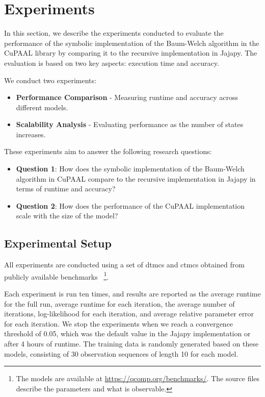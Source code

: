\section{Experiments}\label{sec:experiments}
In this section, we describe the experiments conducted to evaluate the performance of the symbolic implementation of the Baum-Welch algorithm in the CuPAAL library by comparing it to the recursive implementation in Jajapy. The evaluation is based on two key aspects: execution time and accuracy.

We conduct two experiments:
\begin{itemize}
    \item \textbf{Performance Comparison} - Measuring runtime and accuracy across different models.
    \item \textbf{Scalability Analysis} - Evaluating performance as the number of states increases.
\end{itemize}

These experiments aim to answer the following research questions:
\begin{itemize}
    \item \textbf{Question 1}: How does the symbolic implementation of the Baum-Welch algorithm in CuPAAL compare to the recursive implementation in Jajapy in terms of runtime and accuracy?
    \item \textbf{Question 2}: How does the performance of the CuPAAL implementation scale with the size of the model?
\end{itemize}

\subsection{Experimental Setup}
All experiments are conducted using a set of \glspl{dtmc} and \glspl{ctmc} obtained from publicly available benchmarks~\cite{hartmanns2019quantitative}
\footnote{The models are available at \url{https://qcomp.org/benchmarks/}. The source files describe the parameters and what is observable.}.

Each experiment is run ten times, and results are reported as the average runtime for the full run, average runtime for each iteration,
the average number of iterations, log-likelihood for each iteration, and average relative parameter error for each iteration.
We stop the experiments when we reach a convergence threshold of 0.05, which was the default value in the Jajapy implementation or after
4 hours of runtime.
The training data is randomly generated based on these models, consisting of 30 observation sequences of length 10 for each model.

